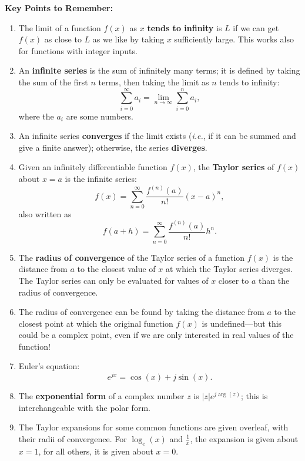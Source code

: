 \documentclass{article}
\begin{document}
\clearpage


{\bf Key Points to Remember:}

\vspace{5mm}

\begin{enumerate}
	\item The limit of a function $f(x)$ as $x$ \textbf{tends to infinity} is $L$ if we can get $f(x)$ as close to $L$ as we like by taking $x$ sufficiently large. This works also for functions with integer inputs.
	\item An \textbf{infinite series} is the sum of infinitely many terms; it is defined by taking the sum of the first $n$ terms, then taking the limit as $n$ tends to infinity:
		\[\sum_{i=0}^\infty a_i=\lim_{n\to\infty}\sum_{i=0}^n a_i,\]
		where the $a_i$ are some numbers.
	\item An infinite series \textbf{converges} if the limit exists (\textit{i.e.}, if it can be summed and give a finite answer); otherwise, the series \textbf{diverges}.
	\item Given an infinitely differentiable function $f(x)$, the \textbf{Taylor series} of $f(x)$ about $x=a$ is the infinite series:
		\[f(x)=\sum_{n=0}^\infty \frac{f^{(n)}(a)}{n!}(x-a)^n,\]
		also written as
		\[f(a+h)=\sum_{n=0}^\infty \frac{f^{(n)}(a)}{n!}h^n.\]
	\item The \textbf{radius of convergence} of the Taylor series of a function $f(x)$ is the distance from $a$ to the closest value of $x$ at which the Taylor series diverges. The Taylor series can only be evaluated for values of $x$ closer to $a$ than the radius of convergence.
	\item The radius of convergence can be found by taking the distance from $a$ to the closest point at which the original function $f(x)$ is undefined---but this could be a complex point, even if we are only interested in real values of the function!
	\item Euler's equation:
		\[e^{jx}=\cos(x)+j\sin(x).\]
	\item The \textbf{exponential form} of a complex number $z$ is $|z|e^{j\arg(z)}$; this is interchangeable with the polar form.
	\item The Taylor expansions for some common functions are given overleaf, with their radii of convergence. For $\log_e(x)$ and $\frac{1}{x}$, the expansion is given about $x=1$, for all others, it is given about $x=0$.
\end{enumerate}

\clearpage
\end{document}
